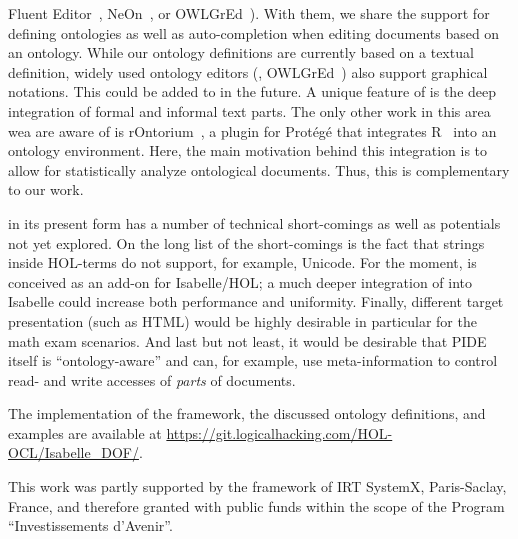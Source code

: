 \begin{isabellebody}
\begin{isamarkuptext}
Fluent Editor~\cite{cognitum}, NeOn~\cite{neon}, or
OWLGrEd~\cite{owlgred}). With them, we share the support for defining
ontologies as well as auto-completion when editing documents based on
an ontology. While our ontology definitions are currently based on a
textual definition, widely used ontology editors (\eg,
OWLGrEd~\cite{owlgred}) also support graphical notations. This could
be added to \isadof in the future. A unique feature of \isadof is the
deep integration of formal and informal text parts. The only other
work in this area wea are aware of is rOntorium~\cite{rontorium}, a plugin
for Prot{\'e}g{\'e} that integrates R~\cite{adler:r:2010} into an
ontology environment. Here, the main motivation behind this
integration is to allow for statistically analyze ontological
documents. Thus, this is complementary to our work.%
\end{isamarkuptext}\isamarkuptrue%
%
\begin{isamarkuptext}%
\isadof in its present form has a number of technical short-comings as well 
  as potentials not yet explored. On the long list of the short-comings is the 
  fact that strings inside HOL-terms do not support, for example, Unicode. 
  For the moment, \isadof is conceived as an 
  add-on for Isabelle/HOL; a much deeper integration of \isadof into Isabelle 
  could increase both performance and uniformity. Finally, different target 
  presentation (such as HTML) would be highly desirable in particular for the 
  math exam scenarios. And last but not least, it would be desirable that PIDE 
  itself is ``ontology-aware'' and can, for example, use meta-information
  to control read- and write accesses of \emph{parts} of documents.%
\end{isamarkuptext}\isamarkuptrue%
%
\isamarkuptrue%
%
\begin{isamarkuptext}%
The implementation of the framework, the discussed ontology definitions, 
        and examples  are available at 
        \url{https://git.logicalhacking.com/HOL-OCL/Isabelle_DOF/}.%
\end{isamarkuptext}\isamarkuptrue%
%
\isamarkuptrue%
%
\begin{isamarkuptext}%
This work was partly supported by  the framework of IRT SystemX, Paris-Saclay, France, 
and therefore granted with public funds within the scope of the 
Program ``Investissements d’Avenir''.%
\end{isamarkuptext}\isamarkuptrue%
%
\isadelimtheory
%
\endisadelimtheory
%
\isatagtheory
%
\endisatagtheory
{\isafoldtheory}%
%
\isadelimtheory
%
\endisadelimtheory
%
\end{isabellebody}%
